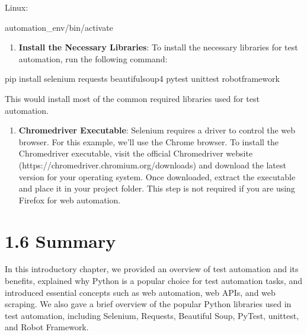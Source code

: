 \documentclass[
  paper=a4,
  ,captions=tableheading
]{scrartcl}
\newenvironment{Shaded}{}{}
\newcommand{\ExtensionTok}[1]{#1}
\newcommand{\NormalTok}[1]{#1}
\providecommand{\tightlist}{%
  \setlength{\itemsep}{0pt}\setlength{\parskip}{0pt}}
\begin{document}
Linux:

\begin{Shaded}
\begin{Highlighting}[]
\ExtensionTok{automation\_env/bin/activate}
\end{Highlighting}
\end{Shaded}

\begin{enumerate}
\def\labelenumi{\arabic{enumi}.}
\tightlist
\item
  \textbf{Install the Necessary Libraries}: To install the necessary
  libraries for test automation, run the following command:
\end{enumerate}

\begin{Shaded}
\begin{Highlighting}[]
\ExtensionTok{pip}\NormalTok{ install selenium requests beautifulsoup4 pytest unittest robotframework}
\end{Highlighting}
\end{Shaded}

This would install most of the common required libraries used for test
automation.

\begin{enumerate}
\def\labelenumi{\arabic{enumi}.}
\tightlist
\item
  \textbf{Chromedriver Executable}: Selenium requires a driver to
  control the web browser. For this example, we'll use the Chrome
  browser. To install the Chromedriver executable, visit the official
  Chromedriver website (https://chromedriver.chromium.org/downloads) and
  download the latest version for your operating system. Once
  downloaded, extract the executable and place it in your project
  folder. This step is not required if you are using Firefox for web
  automation.
\end{enumerate}

\hypertarget{summary}{%
\section{1.6 Summary}\label{summary}}

In this introductory chapter, we provided an overview of test automation
and its benefits, explained why Python is a popular choice for test
automation tasks, and introduced essential concepts such as web
automation, web APIs, and web scraping. We also gave a brief overview of
the popular Python libraries used in test automation, including
Selenium, Requests, Beautiful Soup, PyTest, unittest, and Robot
Framework.
\end{document}
